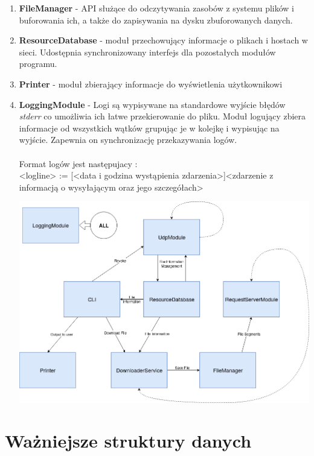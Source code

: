 \documentclass[11pt,oneside]{book}
\newcommand{\+}{\discretionary{\mbox{\scriptsize$\hookleftarrow$}}{}{}}
\begin{document}
\begin{enumerate}
	\item 
\textbf{FileManager} - API służące do odczytywania zasobów z systemu plików i buforowania ich, a także do zapisywania na dysku zbuforowanych danych.
	\item 
\textbf{ResourceDatabase} - moduł przechowujący informacje o plikach i hostach w sieci. Udostępnia synchronizowany interfejs dla pozostałych modułów programu.
	\item 
\textbf{Printer} - moduł zbierający informacje do wyświetlenia użytkownikowi
	\item 
\textbf{LoggingModule} - Logi są wypisywane na standardowe wyjście błędów \textit{stderr} co umożliwia ich łatwe przekierowanie do pliku. Moduł logujący zbiera informacje od wszystkich wątków grupując je w kolejkę i wypisując na wyjście. Zapewnia on synchronizację przekazywania logów.
\\\\
Format logów jest następujacy : \\
<logline> := [<data i godzina wystąpienia zdarzenia>]<zdarzenie z informacją o wysyłającym oraz jego szczegółach>

\begin{centering}
	\includegraphics[width=\textwidth]{modules}
\end{centering}

\end{enumerate}
\section{Ważniejsze struktury danych}
\end{document}
